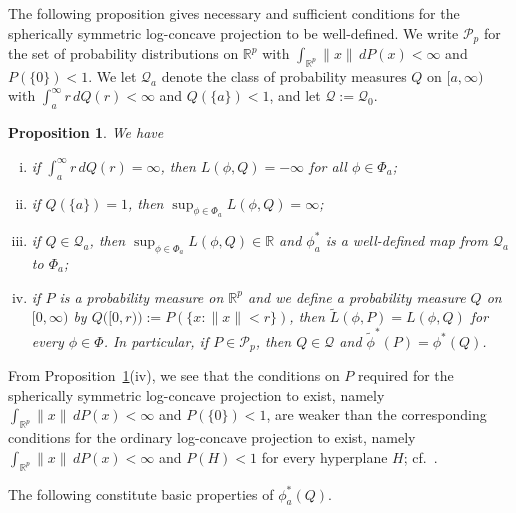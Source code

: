 \documentclass[a4paper,12pt]{article}
\newtheorem{proposition}[theorem]{Proposition}
\newenvironment{remark}[1][Remark:]{\begin{trivlist}
\item[\hskip \labelsep {\bfseries #1}]}{\end{trivlist}}
\begin{document}
The following proposition gives necessary and sufficient conditions for the spherically symmetric log-concave projection to be well-defined.  We write $\mathcal{P}_p$ for the set of probability distributions on $\mathbb{R}^p$ with  $\int_{\mathbb{R}^p} \| x \| \, dP(x) < \infty$ and $P(\{0 \}) < 1$.  We let $\mathcal{Q}_{a}$ denote the class of probability measures $Q$ on $[a,\infty)$ with $\int_{a}^\infty r \, dQ(r) < \infty$ and $Q(\{a\}) < 1$, and let $\mathcal{Q} := \mathcal{Q}_0$.
\begin{proposition}
\label{Prop:ProjectionExistence}
We have 
\begin{enumerate}[(i)]
\item if $\int_{a}^\infty r \, dQ(r) = \infty$, then $L(\phi, Q) = - \infty$ for all $\phi \in \Phi_{a}$;
\item if $Q(\{a\}) = 1$, then $\sup_{\phi \in \Phi_{a}} L(\phi, Q) = \infty$;
\item if $Q \in \mathcal{Q}_{a}$, then $\sup_{\phi \in \Phi_{a}} L(\phi, Q) \in \mathbb{R}$ and $\phi_{a}^*$ is a well-defined map from $\mathcal{Q}_{a}$ to $\Phi_{a}$;
\item if $P$ is a probability measure on $\mathbb{R}^p$ and we define a probability measure $Q$ on $[0,\infty)$ by $Q\bigl([0,r)\bigr) := P(\{x:\|x\| < r\})$, then $\tilde{L}(\phi,P) = L(\phi,Q)$ for every $\phi \in \Phi$.  In particular, if $P \in \mathcal{P}_p$, then $Q \in \mathcal{Q}$ and $\tilde{\phi}^*(P) = \phi^*(Q)$.
\end{enumerate}
\end{proposition}
\begin{remark}
From Proposition~\ref{Prop:ProjectionExistence}(iv), we see that the conditions on $P$ required for the spherically symmetric log-concave projection to exist, namely $\int_{\mathbb{R}^p} \| x \| \, dP(x) < \infty$ and $P(\{0 \}) < 1$, are weaker than the corresponding conditions for the ordinary log-concave projection to exist, namely $\int_{\mathbb{R}^p} \| x \| \, dP(x) < \infty$ and $P(H) < 1$ for every hyperplane $H$; cf.~\citet[][Theorem~2.2]{dumbgen2011approximation}.
\end{remark}
The following constitute basic properties of $\phi^*_{a}(Q)$.
\end{document}
